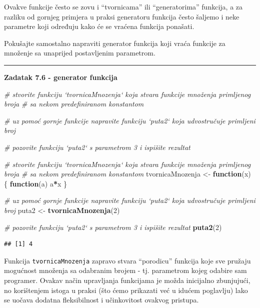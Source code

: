 \documentclass[]{book}
\newenvironment{Shaded}{\begin{snugshade}}{\end{snugshade}}
\newcommand{\KeywordTok}[1]{\textcolor[rgb]{0.13,0.29,0.53}{\textbf{#1}}}
\newcommand{\DecValTok}[1]{\textcolor[rgb]{0.00,0.00,0.81}{#1}}
\newcommand{\StringTok}[1]{\textcolor[rgb]{0.31,0.60,0.02}{#1}}
\newcommand{\CommentTok}[1]{\textcolor[rgb]{0.56,0.35,0.01}{\textit{#1}}}
\newcommand{\ControlFlowTok}[1]{\textcolor[rgb]{0.13,0.29,0.53}{\textbf{#1}}}
\newcommand{\OperatorTok}[1]{\textcolor[rgb]{0.81,0.36,0.00}{\textbf{#1}}}
\newcommand{\NormalTok}[1]{#1}
\theoremstyle{definition}
\theoremstyle{definition}
\theoremstyle{definition}
\theoremstyle{remark}
\begin{document}
Ovakve funkcije često se zovu i ``tvornicama'' ili ``generatorima''
funkcija, a za razliku od gornjeg primjera u praksi generatoru funkcija
često šaljemo i neke parametre koji određuju kako će se vraćena funkcija
ponašati.

Pokušajte samostalno napraviti generator funkcija koji vraća funkcije za
množenje sa unaprijed postavljenim parametrom.

\begin{center}\rule{0.5\linewidth}{\linethickness}\end{center}

\textbf{Zadatak 7.6 - generator funkcija}

\begin{Shaded}
\begin{Highlighting}[]
\CommentTok{# stvorite funkciju `tvornicaMnozenja` koja stvara funkcije množenja primljenog broja }
\CommentTok{# sa nekom predefiniranom konstantom}

\CommentTok{# uz pomoć gornje funkcije napravite funkciju `puta2` koja udvostručuje primljeni broj}

\CommentTok{# pozovite funkciju `puta2` s parametrom 3 i ispišite rezultat}
\end{Highlighting}
\end{Shaded}

\begin{Shaded}
\begin{Highlighting}[]
\CommentTok{# stvorite funkciju `tvornicaMnozenja` koja stvara funkcije množenja primljenog broja }
\CommentTok{# sa nekom predefiniranom konstantom}
\NormalTok{tvornicaMnozenja <-}\StringTok{ }\ControlFlowTok{function}\NormalTok{(x) \{}
  \ControlFlowTok{function}\NormalTok{(a) a}\OperatorTok{*}\NormalTok{x}
\NormalTok{\}}

\CommentTok{# uz pomoć gornje funkcije napravite funkciju `puta2` koja udvostručuje primljeni broj}
\NormalTok{puta2 <-}\StringTok{ }\KeywordTok{tvornicaMnozenja}\NormalTok{(}\DecValTok{2}\NormalTok{)}

\CommentTok{# pozovite funkciju `puta2` s parametrom 3 i ispišite rezultat}
\KeywordTok{puta2}\NormalTok{(}\DecValTok{2}\NormalTok{)}
\end{Highlighting}
\end{Shaded}

\begin{verbatim}
## [1] 4
\end{verbatim}

Funkcija \texttt{tvornicaMnozenja} zapravo stvara ``porodicu'' funkcija
koje sve pružaju mogućnost množenja sa odabranim brojem - tj. parametrom
kojeg odabire sam programer. Ovakav način upravljanja funkcijama je
možda inicijalno zbunjujući, no korištenjem istoga u praksi (što ćemo
prikazati već u idućem poglavlju) lako se uočava dodatna fleksibilnost i
učinkovitost ovakvog pristupa.
\end{document}
